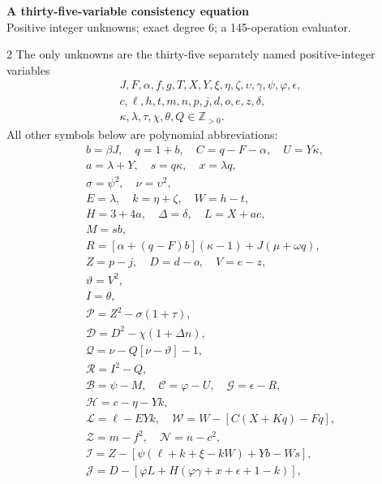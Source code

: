 \documentclass[10pt]{article}
\begin{document}
\begin{center}
{\large\bfseries A thirty-five-variable consistency equation}\\[-1pt]
{\small Positive integer unknowns; exact degree 6; a 145-operation evaluator.}
\end{center}\vspace{-8pt}
\begin{multicols}{2}
\fontsize{8.6}{9.1}\selectfont
The only unknowns are the thirty-five separately named positive-integer variables
\[
\begin{gathered}J,F,\alpha,f,g,T,X,Y,\xi,\eta,\zeta,\upsilon,\gamma,\psi,\varphi,\epsilon,\\
c,\ell,h,t,m,n,p,j,d,o,e,z,\delta,\\
\kappa,\lambda,\tau,\chi,\theta,Q\in\mathbb Z_{>0}.\end{gathered}
\]
All other symbols below are polynomial abbreviations:
\[
\begin{gathered}
b=\beta J,\quad q=1+b,\quad C=q-F-\alpha,\quad U=Y\kappa,\\
a=\lambda+Y,\quad s=q\kappa,\quad x=\lambda q,\\
\sigma=\psi^2,\quad\nu=\upsilon^2,\\
E=\lambda,\quad k=\eta+\zeta,\quad W=h-t,\\
H=3+4a,\quad\Delta=\delta,\quad L=X+ac,\\
M=sb,\\
R=[\alpha+(q-F)b](\kappa-1)+J(\mu+\omega q),\\
Z=p-j,\quad D=d-o,\quad V=e-z,\\
\vartheta=V^2,\\
I=\theta,\\
\mathcal{P}=Z^2-\sigma(1+\tau),\\
\mathcal{D}=D^2-\chi(1+\Delta n),\\
\mathcal{Q}=\nu-Q[\nu-\vartheta]-1,\\
\mathcal{R}=I^2-Q,\\
\mathcal{B}=\psi-M,\quad \mathcal{C}=\varphi-U,\quad \mathcal{G}=\epsilon-R,\\
\mathcal{H}=c-\eta-Yk,\\
\mathcal{L}=\ell-EYk,\quad \mathcal{W}=W-[C(X+Kq)-Fq],\\
\mathcal{Z}=m-f^2,\quad \mathcal{N}=n-c^2,\\
\mathcal{I}=Z-[\psi(\ell+k+\xi-kW)+Yb-Ws],\\
\mathcal{J}=D-[\varphi L+H(\varphi\gamma+x+\epsilon+1-k)],\\

\end{gathered}\]
\end{multicols}
\end{document}
